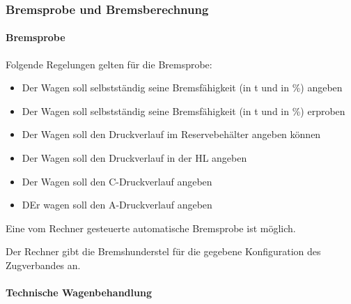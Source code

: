 \subsubsection{Bremsprobe und Bremsberechnung}
\paragraph{Bremsprobe}
\begin{feat}
Folgende Regelungen gelten für die Bremsprobe:
\begin{itemize}
    \item Der Wagen soll selbstständig seine Bremsfähigkeit (in t und in \%) angeben
    \item Der Wagen soll selbstständig seine Bremsfähigkeit (in t und in \%) erproben
    \item Der Wagen soll den Druckverlauf im Reservebehälter angeben können
    \item Der Wagen soll den Druckverlauf in der \acrshort{HL} angeben
    \item Der Wagen soll den C-Druckverlauf angeben
    \item DEr wagen soll den A-Druckverlauf angeben
\end{itemize}
\end{feat}
\begin{feat}
Eine vom Rechner gesteuerte automatische Bremsprobe ist möglich.
\end{feat}
\begin{rem} [zu Anf. 50] 
Der Rechner gibt die Bremshunderstel für die gegebene Konfiguration des Zugverbandes an.
\begin{comment}
Diese hat sich für folgende Fahrten zu unterscheiden:
\begin{itemize}
    \item für Bedienfahrt
    \item für Rangierfahrt
    \item für Sperrfahrt
    \item für Zugfahrt
\end{itemize}
\end{comment}
\end{rem}

\paragraph{Technische Wagenbehandlung}
\begin{comment}
\begin{feat}
So weit eine technische Wagenbehandlung aktor- und sensorgeführt möglich ist, soll diese integriert werden.
\end{feat}
\begin{feat}
Folgende Regelungen gelten für die technische Wagenbehandlung:
\begin{itemize}
    \item Hier muss was hin
\end{itemize}
\end{feat}
\end{comment}

